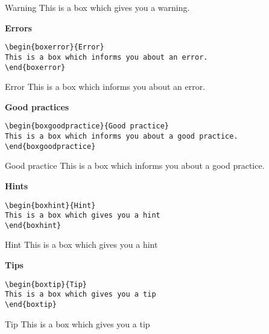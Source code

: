 \documentclass[a4paper,10pt]{report}
\begin{document}
\begin{boxwarning}{Warning}
This is a box which gives you a warning.
\end{boxwarning}

\vspace{2ex}

\textbf{Errors}
\begin{verbatim}
\begin{boxerror}{Error}
This is a box which informs you about an error.
\end{boxerror}
\end{verbatim}

\begin{boxerror}{Error}
This is a box which informs you about an error.
\end{boxerror}

\vspace{2ex}

\textbf{Good practices}
\begin{verbatim}
\begin{boxgoodpractice}{Good practice}
This is a box which informs you about a good practice.
\end{boxgoodpractice}
\end{verbatim}

\begin{boxgoodpractice}{Good practice}
This is a box which informs you about a good practice.
\end{boxgoodpractice}

\vspace{2ex}

\textbf{Hints}
\begin{verbatim}
\begin{boxhint}{Hint}
This is a box which gives you a hint
\end{boxhint}
\end{verbatim}

\begin{boxhint}{Hint}
This is a box which gives you a hint
\end{boxhint}

\newpage

\textbf{Tips}
\begin{verbatim}
\begin{boxtip}{Tip}
This is a box which gives you a tip
\end{boxtip}
\end{verbatim}

\begin{boxtip}{Tip}
This is a box which gives you a tip
\end{boxtip}
\end{document}
